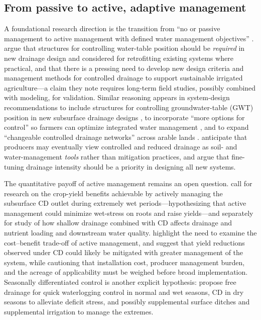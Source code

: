 \subsection{From passive to active, adaptive management}
A foundational research direction is the transition from ``no or passive management to active management with defined water management objectives'' \parencite{Ayars2006b}. \textcite{Ayars2006b} argue that structures for controlling water-table position should be \emph{required} in new drainage design and considered for retrofitting existing systems where practical, and that there is a pressing need to develop new design criteria and management methods for controlled drainage to support sustainable irrigated agriculture---a claim they note requires long-term field studies, possibly combined with modeling, for validation. Similar reasoning appears in system-design recommendations to include structures for controlling groundwater-table (GWT) position in new subsurface drainage designs \parencite{Dukhovny2018}, to incorporate ``more options for control'' so farmers can optimize integrated water management \parencite{Ritzema2023}, and to expand ``changeable controlled drainage networks'' across arable lands \parencite{Mahmoud2021}. \textcite{Strock2011} anticipate that producers may eventually view controlled and reduced drainage as soil- and water-management \emph{tools} rather than mitigation practices, and argue that fine-tuning drainage intensity should be a priority in designing all new systems.

The quantitative payoff of active management remains an open question. \textcite{Watkins2024} call for research on the crop-yield benefits achievable by actively managing the subsurface CD outlet during extremely wet periods---hypothesizing that active management could minimize wet-stress on roots and raise yields---and separately for study of how shallow drainage combined with CD affects drainage and nutrient loading and downstream water quality. \textcite{Saadat2017} highlight the need to examine the cost--benefit trade-off of active management, and \textcite{Helmers2012} suggest that yield reductions observed under CD could likely be mitigated with greater management of the system, while cautioning that installation cost, producer management burden, and the acreage of applicability must be weighed before broad implementation. Seasonally differentiated control is another explicit hypothesis: \textcite{Asgari2021} propose free drainage for quick waterlogging control in normal and wet seasons, CD in dry seasons to alleviate deficit stress, and possibly supplemental surface ditches and supplemental irrigation to manage the extremes.

